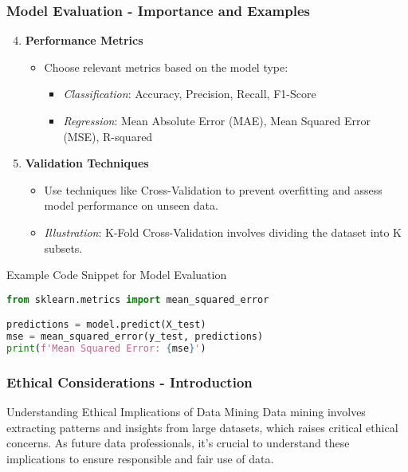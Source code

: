 \documentclass{beamer}
\begin{document}
\begin{frame}[fragile]
    \frametitle{Model Evaluation - Importance and Examples}
    \begin{enumerate}
        \setcounter{enumi}{3}
        \item \textbf{Performance Metrics}
            \begin{itemize}
                \item Choose relevant metrics based on the model type:
                    \begin{itemize}
                        \item \textit{Classification}: Accuracy, Precision, Recall, F1-Score
                        \item \textit{Regression}: Mean Absolute Error (MAE), Mean Squared Error (MSE), R-squared
                    \end{itemize}
            \end{itemize}

        \item \textbf{Validation Techniques}
            \begin{itemize}
                \item Use techniques like Cross-Validation to prevent overfitting and assess model performance on unseen data.
                \item \textit{Illustration}: K-Fold Cross-Validation involves dividing the dataset into K subsets.
            \end{itemize}
    \end{enumerate}

    \begin{block}{Example Code Snippet for Model Evaluation}
    \begin{lstlisting}[language=Python]
from sklearn.metrics import mean_squared_error

predictions = model.predict(X_test)
mse = mean_squared_error(y_test, predictions)
print(f'Mean Squared Error: {mse}')
    \end{lstlisting}
    \end{block}
\end{frame}

\begin{frame}[fragile]
    \frametitle{Ethical Considerations - Introduction}
    \begin{block}{Understanding Ethical Implications of Data Mining}
        Data mining involves extracting patterns and insights from large datasets, which raises critical ethical concerns. 
        As future data professionals, it's crucial to understand these implications to ensure responsible and fair use of data.
    \end{block}
\end{frame}
\end{document}
